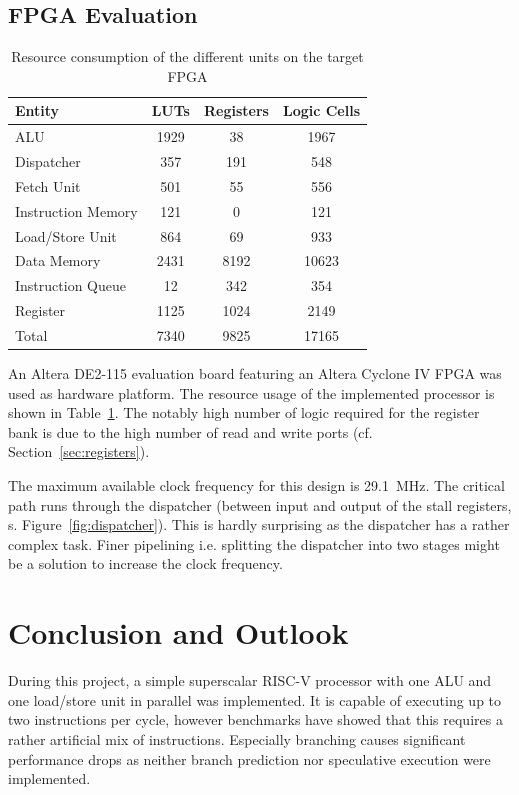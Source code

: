 \documentclass[conference]{IEEEtran}
\begin{document}
\subsection{FPGA Evaluation}

\begin{table}
	\caption{Resource consumption of the different units on the target FPGA}
	\centering
	\begin{tabular}{l c c c}
			Entity & LUTs & Registers & Logic Cells \\
		\midrule
			ALU & 1929 & 38 & 1967 \\
			Dispatcher & 357 & 191 & 548 \\
			Fetch Unit & 501 & 55 & 556 \\
			Instruction Memory & 121 & 0 & 121 \\
			Load/Store Unit & 864 & 69 & 933 \\
			Data Memory & 2431 & 8192 & 10623 \\
			Instruction Queue & 12 & 342 & 354 \\
			Register & 1125 & 1024 & 2149 \\
		\midrule
			Total & 7340 & 9825 & 17165 \\
	\end{tabular}
	\label{tab:resources}
\end{table}

An Altera DE2-115 evaluation board featuring an Altera Cyclone IV FPGA was used as hardware platform. The resource usage of the implemented processor is shown in Table~\ref{tab:resources}. 
The notably high number of logic required for the register bank is due to the high number of read and write ports (cf. Section~\ref{sec:registers}).

The maximum available clock frequency for this design is \SI{29.1}{\MHz}. The critical path runs through the dispatcher (between input and output of the stall registers, s. Figure~\ref{fig:dispatcher}). This is hardly surprising as the dispatcher has a rather complex task. Finer pipelining i.e. splitting the dispatcher into two stages might be a solution to increase the clock frequency.

\section{Conclusion and Outlook} \label{sec:conclusion}

During this project, a simple superscalar RISC-V processor with one ALU and one load/store unit in parallel was implemented. It is capable of executing up to two instructions per cycle, however benchmarks have showed that this requires a rather artificial mix of instructions. Especially branching causes significant performance drops as neither branch prediction nor speculative execution were implemented.
\end{document}
